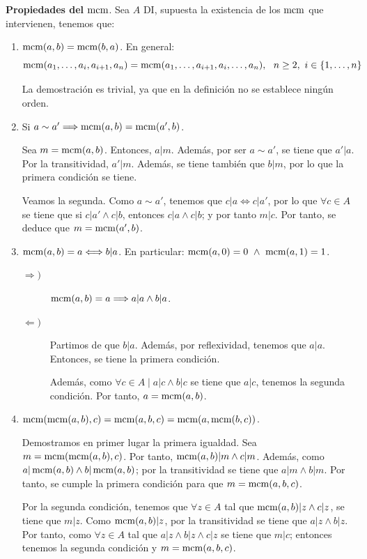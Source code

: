 \textbf{Propiedades del $\operatorname{mcm}$}. Sea $A$ DI, supuesta la existencia de los $\operatorname{mcm}$ que intervienen, tenemos que:
\begin{enumerate}
    \item $\operatorname{mcm}(a,b)=\operatorname{mcm}(b,a)$. En general:
    $$\operatorname{mcm}(a_1, \ldots, a_i, a_{i+1}, a_n) = \operatorname{mcm}(a_1, \ldots, a_{i+1}, a_i, \ldots, a_n),~~n\geq2,~i\in \{1, \ldots, n\}$$

    La demostración es trivial, ya que en la definición no se establece ningún orden.

    \item Si $a\sim a' \Longrightarrow \operatorname{mcm}(a,b) = \operatorname{mcm}(a',b)$.
    
    Sea $m = \operatorname{mcm}(a,b)$. Entonces, $a|m$. Además, por ser $a\sim a'$, se tiene que $a'|a$. Por la transitividad, $a'|m$. Además, se tiene también que $b|m$, por lo que la primera condición se tiene.

    Veamos la segunda. Como $a\sim a'$, tenemos que $c|a\Longleftrightarrow c|a'$, por lo que $\forall c\in A$ se tiene que si $c|a'\land c|b$, entonces $c|a\land c|b$; y por tanto $m|c$. Por tanto, se deduce que 
    $m=\operatorname{mcm}(a',b)$.

    \item $\operatorname{mcm}(a,b)=a \Longleftrightarrow b|a$. En particular: $\operatorname{mcm}(a,0) = 0 \ \land \  \operatorname{mcm}(a,1) = 1$.
    \begin{description}
        \item[$\Longrightarrow)$] $\operatorname{mcm}(a,b)=a\Longrightarrow a|a\land b|a$.
        \item[$\Longleftarrow)$] Partimos de que $b|a$. Además, por reflexividad, tenemos que $a|a$. Entonces, se tiene la primera condición.

        Además, como $\forall c\in A\mid a|c\land b|c$ se tiene que $a|c$, tenemos la segunda condición. Por tanto, $a=\operatorname{mcm}(a,b)$.
    \end{description}


    \item $\operatorname{mcm}(\operatorname{mcm}(a,b), c)=\operatorname{mcm}(a,b,c) = \operatorname{mcm}(a,\operatorname{mcm}(b,c))$.

    Demostramos en primer lugar la primera igualdad. Sea $m=\operatorname{mcm}(\operatorname{mcm}(a,b),c)$. Por tanto, $\operatorname{mcm}(a,b)|m\land c|m$. Además, como $a|\operatorname{mcm}(a,b)\land b|\operatorname{mcm}(a,b)$; por la transitividad se tiene que $a|m\land b|m$. Por tanto, se cumple la primera condición para que $m=\operatorname{mcm}(a,b,c)$.

    Por la segunda condición, tenemos que $\forall z\in A$ tal que $\operatorname{mcm}(a,b)|z \land c|z$, se tiene que $m|z$. Como $\operatorname{mcm}(a,b)|z$, por la transitividad se tiene que $a|z\land b|z$. Por tanto, como $\forall z\in A$ tal que $a|z\land b|z\land c|z$ se tiene que $m|c$; entonces tenemos la segunda condición y $m=\operatorname{mcm}(a,b,c)$.\\


\end{enumerate}
